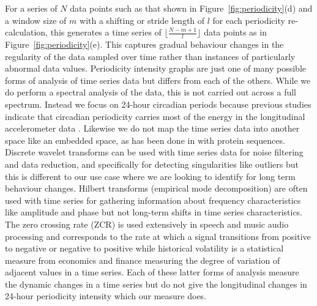 \documentclass[preprints,article,accept,pdftex,moreauthors]{Definitions/mdpi}
\begin{document}
For a series of $N$ data points such as that shown in Figure~\ref{fig:periodicity}(d) and a window size of {$m$} with a  shifting or stride {length} of {$l$} for each periodicity re-calculation, this generates a  time series of {$\lfloor \frac{N - m + 1}{l}\rfloor$} data points as  in Figure~\ref{fig:periodicity}(e){. This } captures  gradual behaviour changes in the regularity of the data sampled over time {rather than}  instances of particularly abnormal data values.
{Periodicity intensity graphs are just one of many possible forms of analysis of time series data but differs from each of the others. While we do perform a spectral analysis \cite{10.1145/380752.380859} of the data, this is not carried out across a full spectrum. Instead we focus on 24-hour circadian periods because previous studies indicate that circadian periodicity carries most of the energy in the longitudinal accelerometer data \cite{montaruli2021biological}. Likewise we do not map the time series data into another space like an embedded space, as has been done in \cite{ho2019using} with protein sequences.  Discrete wavelet transforms \cite{rhif2019wavelet} can be used with time series data for noise filtering and data reduction, and specifically for detecting  singularities like outliers \cite{10.1145/1883612.1883613} but this is different to our use case where we are looking to identify for long term behaviour changes.   Hilbert transforms (empirical mode decomposition) \cite{shukla2009empirical} are often used with time series for gathering information about frequency characteristics like amplitude and phase but not long-term shifts in time series characteristics. The zero crossing rate (ZCR) \cite{lartillot2007matlab} is used extensively in speech and music audio processing and corresponds to the rate at which a signal transitions from positive to negative or negative to positive  while  historical volatility \cite{hong2017general} is a statistical measure from economics and finance measuring the degree of variation of adjacent values in a time series. Each of these latter forms of analysis measure the dynamic changes in a time series but do not give the longitudinal changes in 24-hour periodicity intensity which our measure does.}
\end{document}
